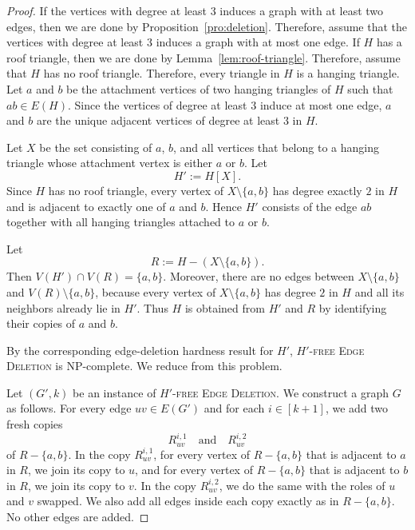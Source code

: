 \documentclass[a4paper,UKenglish,cleveref, autoref, thm-restate]{lipics-v2021}
\begin{document}
\hangingTriangleLemma*

\begin{proof}

    If the vertices with degree at least 3 induces a graph with at least two edges, then we are done by Proposition~\ref{pro:deletion}.
    Therefore, assume that the vertices with degree at least 3 induces a graph with at most one edge.
    If $H$ has a roof triangle, then we are done by Lemma~\ref{lem:roof-triangle}.
    Therefore, assume that $H$ has no roof triangle. 
    Therefore, every triangle in $H$ is a hanging triangle. 
    Let $a$ and $b$ be the attachment vertices of two hanging triangles of $H$ such that $ab\in E(H)$.
    Since the vertices of degree at least $3$ induce at most one edge, $a$ and $b$ are the unique adjacent vertices of degree at least $3$ in $H$.

    Let $X$ be the set consisting of $a$, $b$, and all vertices that belong to a hanging triangle whose attachment vertex is either $a$ or $b$.
    Let
    \[
        H' := H[X].
    \]
    Since $H$ has no roof triangle, every vertex of $X\setminus \{a,b\}$ has degree exactly $2$ in $H$ and is adjacent to exactly one of $a$ and $b$.
    Hence $H'$ consists of the edge $ab$ together with all hanging triangles attached to $a$ or $b$.

    Let
    \[
        R := H-(X\setminus \{a,b\}).
    \]
    Then $V(H')\cap V(R)=\{a,b\}$.
    Moreover, there are no edges between $X\setminus \{a,b\}$ and $V(R)\setminus \{a,b\}$, because every vertex of $X\setminus \{a,b\}$ has degree $2$ in $H$ and all its neighbors already lie in $H'$.
    Thus $H$ is obtained from $H'$ and $R$ by identifying their copies of $a$ and $b$.

    By the corresponding edge-deletion hardness result for $H'$, \textsc{$H'$-free Edge Deletion} is NP-complete.
    We reduce from this problem.

    Let $(G',k)$ be an instance of \textsc{$H'$-free Edge Deletion}.
    We construct a graph $G$ as follows.
    For every edge $uv\in E(G')$ and for each $i\in [k+1]$, we add two fresh copies
    \[
        R_{uv}^{i,1}\quad\text{and}\quad R_{uv}^{i,2}
    \]
    of $R-\{a,b\}$.
    In the copy $R_{uv}^{i,1}$, for every vertex of $R-\{a,b\}$ that is adjacent to $a$ in $R$, we join its copy to $u$, and for every vertex of $R-\{a,b\}$ that is adjacent to $b$ in $R$, we join its copy to $v$.
    In the copy $R_{uv}^{i,2}$, we do the same with the roles of $u$ and $v$ swapped.
    We also add all edges inside each copy exactly as in $R-\{a,b\}$.
    No other edges are added.


\end{proof}
\end{document}
